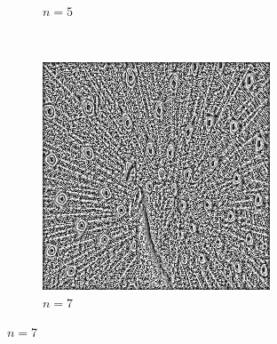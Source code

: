 \documentclass{article}
\begin{document}
\begin{enumerate}[label=(\alph*)]
\begin{figure}[!htb]
\begin{subfigure}[b]{0.3\textwidth}
            \caption{$n = 5$}
        \end{subfigure}
        ~
        \begin{subfigure}[b]{0.3\textwidth}
            \includegraphics[width=\textwidth]{img/L7.png}
            \caption{$n = 7$}
        \end{subfigure}
        
        

\end{figure}
\end{enumerate}
\end{document}
